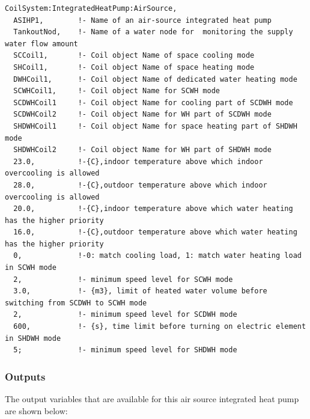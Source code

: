 \begin{lstlisting}
CoilSystem:IntegratedHeatPump:AirSource,
  ASIHP1,        !- Name of an air-source integrated heat pump
  TankoutNod,    !- Name of a water node for  monitoring the supply water flow amount
  SCCoil1,       !- Coil object Name of space cooling mode
  SHCoil1,       !- Coil object Name of space heating mode
  DWHCoil1,      !- Coil object Name of dedicated water heating mode
  SCWHCoil1,     !- Coil object Name for SCWH mode
  SCDWHCoil1     !- Coil object Name for cooling part of SCDWH mode
  SCDWHCoil2     !- Coil object Name for WH part of SCDWH mode
  SHDWHCoil1     !- Coil object Name for space heating part of SHDWH mode
  SHDWHCoil2     !- Coil object Name for WH part of SHDWH mode
  23.0,          !-{C},indoor temperature above which indoor overcooling is allowed
  28.0,          !-{C},outdoor temperature above which indoor overcooling is allowed
  20.0,          !-{C},indoor temperature above which water heating has the higher priority
  16.0,          !-{C},outdoor temperature above which water heating has the higher priority
  0,             !-0: match cooling load, 1: match water heating load in SCWH mode
  2,             !- minimum speed level for SCWH mode
  3.0,           !- {m3}, limit of heated water volume before switching from SCDWH to SCWH mode
  2,             !- minimum speed level for SCDWH mode
  600,           !- {s}, time limit before turning on electric element in SHDWH mode
  5;             !- minimum speed level for SHDWH mode
\end{lstlisting}

\subsubsection{Outputs}\label{outputs-011}

The output variables that are available for this air source integrated heat pump are shown below:

